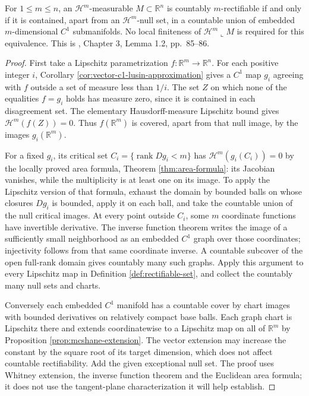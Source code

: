 \begin{theorem}\label{thm:rectifiable-c1-decomposition}
For $1\leq m\leq n$, an $\mathcal H^m$-measurable $M\subset\mathbb R^n$ is countably $m$-rectifiable if and only if it is contained, apart from an $\mathcal H^m$-null set, in a countable union of embedded $m$-dimensional $C^1$ submanifolds. No local finiteness of $\mathcal H^m\llcorner M$ is required for this equivalence. This is \cite{Sim18}, Chapter 3, Lemma 1.2, pp.~85--86.
\end{theorem}
\begin{proof}
First take a Lipschitz parametrization $f:\mathbb R^m\to\mathbb R^n$. For each positive integer $i$, Corollary \ref{cor:vector-c1-lusin-approximation} gives a $C^1$ map $g_i$ agreeing with $f$ outside a set of measure less than $1/i$. The set $Z$ on which none of the equalities $f=g_i$ holds has measure zero, since it is contained in each disagreement set. The elementary Hausdorff-measure Lipschitz bound gives $\mathcal H^m(f(Z))=0$. Thus $f(\mathbb R^m)$ is covered, apart from that null image, by the images $g_i(\mathbb R^m)$.

For a fixed $g_i$, its critical set $C_i=\{\operatorname{rank}Dg_i<m\}$ has $\mathcal H^m(g_i(C_i))=0$ by the locally proved area formula, Theorem \ref{thm:area-formula}: its Jacobian vanishes, while the multiplicity is at least one on its image. To apply the Lipschitz version of that formula, exhaust the domain by bounded balls on whose closures $Dg_i$ is bounded, apply it on each ball, and take the countable union of the null critical images. At every point outside $C_i$, some $m$ coordinate functions have invertible derivative. The inverse function theorem writes the image of a sufficiently small neighborhood as an embedded $C^1$ graph over those coordinates; injectivity follows from that same coordinate inverse. A countable subcover of the open full-rank domain gives countably many such graphs. Apply this argument to every Lipschitz map in Definition \ref{def:rectifiable-set}, and collect the countably many null sets and charts.

Conversely each embedded $C^1$ manifold has a countable cover by chart images with bounded derivatives on relatively compact base balls. Each graph chart is Lipschitz there and extends coordinatewise to a Lipschitz map on all of $\mathbb R^m$ by Proposition \ref{prop:mcshane-extension}. The vector extension may increase the constant by the square root of its target dimension, which does not affect countable rectifiability. Add the given exceptional null set. The proof uses Whitney extension, the inverse function theorem and the Euclidean area formula; it does not use the tangent-plane characterization it will help establish.
\end{proof}

